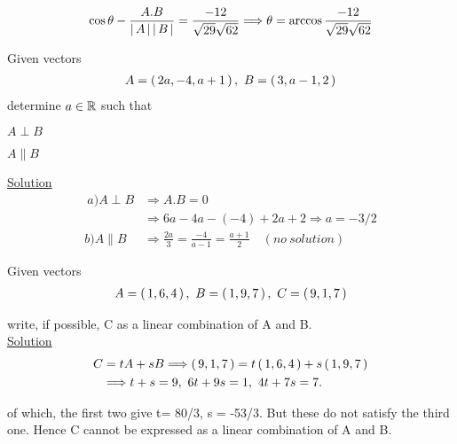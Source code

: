 \documentclass[11pt]{amsbook}
\begin{document}
    \begin{equation*}
        \cos\theta- \frac {A.B} {\left \lvert \, A \, \right \rvert\left \lvert \, B \, \right \rvert}= \frac{-12}{\sqrt{29}\sqrt{62}} \Longrightarrow \theta = \arccos{\frac{-12}{\sqrt{29}\sqrt{62}}}
    \end{equation*}
        
    \begin{exmp}
        Given vectors
        \begin{align*}
            A =  \left( \, 2a, -4, a+1 \, \right) ,\ B =  \left( \, 3, a-1, 2 \, \right) 
        \end{align*}
        determine $a\in \mathbb{R}$ such that \\
        \begin{hEnumerateAlpha}
                \item $A\perp B$
                \item $A\parallel B$\\
        \end{hEnumerateAlpha}
        
        \underline {Solution}        
            \begin{align*}                        
\               a)A \perp B &\Longrightarrow A.B= 0\\
                &\Longrightarrow 6a-4a-(-4)+2a+2                \Longrightarrow     a=-3/2\\
                b) A\parallel B &\Longrightarrow \frac{2a}{3}= \frac{-4}{a-1}= \frac{a+1}{2} \quad (no\ solution) 
            \end{align*}
       
    \end{exmp}
    
    \begin{exmp}
        Given vectors
        \begin{align*}
            A=\hPairingParan{1,6,4},\ B=\hPairingParan{1,9,7},\ C=\hPairingParan{9,1,7}
        \end{align*}
        
        write, if possible, C as a linear combination of A and B.\\
        
       \underline {Solution} \\
        \begin{align*}
            C &= tA+sB \Longrightarrow  \left( \, 9,1,7 \, \right) =t \left( \, 1,6,4 \, \right) +s \left( \, 1,9,7 \, \right) \\
            &\Longrightarrow t+s=9,\ 6t+9s=1,\ 4t+7s=7.\\ 
        \end{align*}
        
        of which, the first two give t= 80/3, s = -53/3. But these do not satisfy the third one. Hence C cannot be expressed as a linear combination of A and B. 

    \end{exmp}
\end{document}
